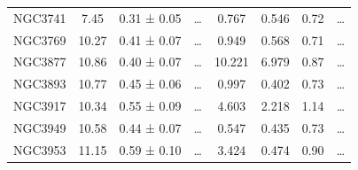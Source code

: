 \documentclass[reprint,%
 amsmath,amssymb,
 aps,
]{revtex4-1}
\begin{document}
\begin{longtable*}{|c|c|c|c|c|c|c|c| }
NGC3741              & 7.45                      & 0.31 ± 0.05           & …                      & 0.767                                                        & 0.546                                                          & 0.72                                                           & …                                                             \\
NGC3769              & 10.27                     & 0.41 ± 0.07           & …                      & 0.949                                                        & 0.568                                                           & 0.71                                                          & …                                                             \\
NGC3877              & 10.86                     & 0.40 ± 0.07           & …                      & 10.221                                                       & 6.979                                                          & 0.87                                                          & …                                                             \\
NGC3893              & 10.77                     & 0.45 ± 0.06           & …                      & 0.997                                                        & 0.402                                                        & 0.73                                                       & …                                                             \\
NGC3917              & 10.34                     & 0.55 ± 0.09           & …                      & 4.603                                                        & 2.218                                                           & 1.14                                                          & …                                                             \\
NGC3949              & 10.58                     & 0.44 ± 0.07           & …                      & 0.547                                                        & 0.435                                                         & 0.73                                                          & …                                                             \\
NGC3953              & 11.15                     & 0.59 ± 0.10           & …                      & 3.424                                                        & 0.474                                                       & 0.90                                                          & …                                                             \\

\end{longtable*}
\end{document}

